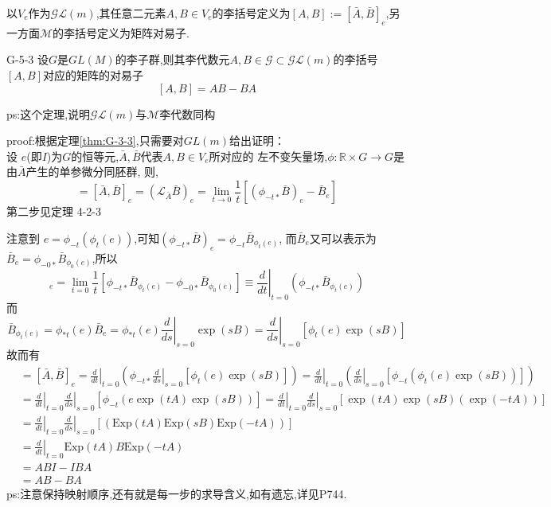 \documentclass[../main.tex]{subfiles}
\begin{document}
     以$V_e$作为$\mathscr{GL}(m)$,其任意二元素$A,B \in V_e$的李括号定义为$[A,B]:=[\bar{A},\bar{B}]_e$,另一方面$\mathscr{M}$的李括号定义为矩阵对易子.
\begin{theorem}{}{G-5-3}
	设$G$是$GL(M)$的李子群,则其李代数元$A,B \in \mathscr{G} \subset \mathscr{GL}(m)$的李括号$[A,B]$对应的矩阵的对易子
	$$ [A,B]=AB - BA $$
\end{theorem}
 ps:这个定理,说明$\mathscr{GL}(m)$与$\mathscr{M}$李代数同构

 proof:根据定理\ref{thm:G-3-3},只需要对$GL(m)$给出证明：\\
 设 $e$(即$I$)为$G$的恒等元,$\bar{A},\bar{B}$代表$A,B\in V_e$所对应的
 左不变矢量场,$\phi:\mathbb{R}\times G \rightarrow G$是由$\bar{A}$产生的单参微分同胚群,
 则,
 \begin{equation*}
 [A,B] = [\bar{A},\bar{B}]_e = (\mathscr{L}_{\bar{A}}\bar{B})_e = \lim_{t\rightarrow 0}\frac{1}{t}[(\phi_{-t*}\bar{B})_e-\bar{B}_e]
 \end{equation*}
 第二步见定理 4-2-3

 注意到 $e = \phi_{-t}(\phi_t (e))$,可知$(\phi_{-t*}\bar{B})_e = \phi_{-t}\bar{B}_{\phi_{t}(e)}$,
 而$\bar{B}_e$又可以表示为$\bar{B}_e=\phi_{-0*}\bar{B}_{\phi_0(e)}$,所以
 \begin{equation*}
     [\bar{A},\bar{B}]_e = \lim_{t=0}\frac{1}{t}[\phi_{-t*}\bar{B}_{\phi_{t}(e)}-\phi_{-0*}\bar{B}_{\phi_0(e)}]\equiv \left.\frac{d}{dt}\right|_{t=0}(\phi_{-t*}\bar{B}_{\phi_{t}(e)}) 
 \end{equation*}
 而\begin{equation*}
     \bar{B}_{\phi_{t}(e)} = \phi_{*t}(e)\bar{B}_e = \phi_{*t}(e)\left.\frac{d}{ds}\right|_{s = 0}\exp(sB) = \left.\frac{d}{ds}\right|_{s = 0}[\phi_{t}(e)\exp(sB)]
 \end{equation*}
 故而有 \begin{align*}
     [A,B]& =[\bar{A},\bar{B}]_e = \left.\frac{d}{dt}\right|_{t=0}\left( \phi_{-t*} \left.\frac{d}{ds}\right|_{s = 0}[\phi_{t}(e)\exp(sB)]\right)
     =\left.\frac{d}{dt}\right|_{t=0}\left(  \left.\frac{d}{ds}\right|_{s = 0}[\phi_{-t}(\phi_{t}(e)\exp(sB))]\right)\\
     &=\left.\frac{d}{dt}\right|_{t=0} \left.\frac{d}{ds}\right|_{s = 0}[\phi_{-t}(e\exp(tA)\exp(sB))]
     =\left.\frac{d}{dt}\right|_{t=0} \left.\frac{d}{ds}\right|_{s = 0}[\exp(tA)\exp(sB)(\exp(-tA))]\\
     &=\left.\frac{d}{dt}\right|_{t=0} \left.\frac{d}{ds}\right|_{s = 0}[(\text{Exp}(tA)\text{Exp}(sB)\text{Exp}(-tA))]\\
     &=\left.\frac{d}{dt}\right|_{t=0}\text{Exp}(tA)B\text{Exp}(-tA)\\
     &= ABI - IBA\\
     &=AB - BA
 \end{align*}
 ps:注意保持映射顺序,还有就是每一步的求导含义,如有遗忘,详见P744.
\end{document}
